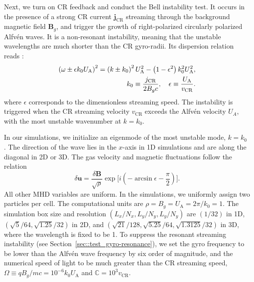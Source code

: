 \documentclass[fleqn,usenatbib]{mnras}
\begin{document}
Next, we turn on CR feedback and conduct
the Bell instability \citep{2004MNRAS.353..550B} test.
It occurs in the presence of a strong CR current $\boldsymbol{j}_\text{CR}$ streaming through the background magnetic field $\boldsymbol{B}_g$, and trigger the growth of right-polarized circularly polarized Alfv\'en waves. It is a non-resonant instability, meaning that
the unstable wavelengths are much shorter than the CR gyro-radii.
Its dispersion relation reads \citep[here we adopt the form given in ][]{2015ApJ...809...55B}:
\begin{align}
	\left(\omega \pm \epsilon k_0 U_\text{A}\right)^2 = \left(k\pm k_0\right)^2 U_\text{A}^2 - \left(1-\epsilon^2\right) k_0^2 U_\text{A}^2, \label{equ::bell_dispersion} \\
	k_0 \equiv \frac{j_\text{CR}}{2B_g c}, \quad \epsilon \equiv \frac{U_\text{A}}{v_\text{CR}}. \notag
\end{align}
where $\epsilon$ corresponds to the dimensionless streaming speed. 
The instability is triggered when the CR streaming velocity $v_\text{CR}$ exceeds the Alfv\'en velocity $U_A$, with the most unstable wavenumber at $k=k_0$.

In our simulations, we initialize an eigenmode of the most unstable mode, $k=k_0$ \citep[given in ][]{2015ApJ...809...55B}. The direction of the wave lies in the $x$-axis in 1D simulations and are along the diagonal in 2D or 3D. The gas velocity and magnetic fluctuations
follow the relation
\begin{equation}
	\delta \boldsymbol{u} = \frac{\delta \boldsymbol{B}}{\sqrt{\rho}} \exp \bigg[i \left(-\arcsin \epsilon - \frac{\pi}{2}\right)\bigg]. \label{equ::bell_unstable}
\end{equation}
All other MHD variables are uniform.
In the simulations, we uniformly assign two particles per cell.
The computational units are $\rho=B_g=U_\text{A}=2 \pi / k_0 = 1$. The simulation box size and resolution $\left(L_x / N_x, L_y / N_y, L_y / N_y \right)$ are $\left(1 / 32\right)$ in 1D, $\left(\sqrt{5} / 64, \sqrt{1.25} / 32\right)$ in 2D, and $\left(\sqrt{21} / 128, \sqrt{5.25} / 64, \sqrt{1.3125} / 32 \right)$ in 3D, where the wavelength is fixed to be 1. 
To suppress the resonant streaming instability (see Section~\ref{sec::test_gyro-resonance}),
we set the gyro frequency to be lower than the Alfv\'en wave frequency by six order of magnitude, and the numerical speed of light to be much greater than the CR streaming speed, $\Omega\equiv q B_g / mc = 10^{-6} k_0 U_\text{A}$ and $\mathbb{C}= 10 ^3 v_\text{CR}$.
\end{document}
